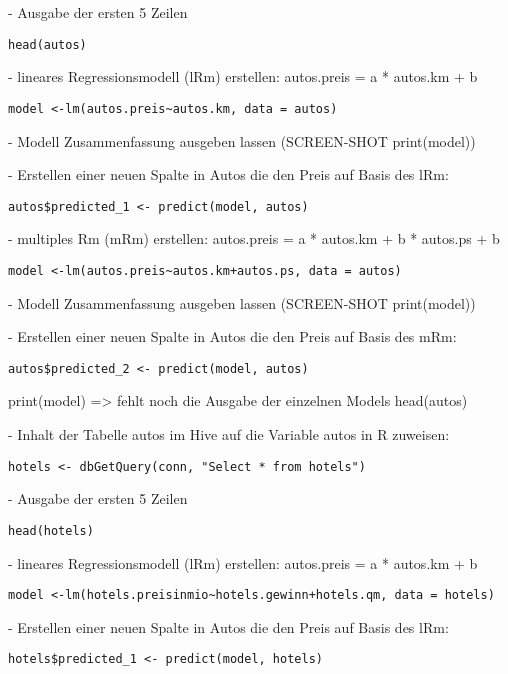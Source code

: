 - Ausgabe der ersten 5 Zeilen
\begin{lstlisting}
head(autos)
\end{lstlisting}

- lineares Regressionsmodell (lRm) erstellen: autos.preis = a * autos.km + b
\begin{lstlisting}
model <-lm(autos.preis~autos.km, data = autos)
\end{lstlisting}

- Modell Zusammenfassung ausgeben lassen (SCREEN-SHOT print(model))


- Erstellen einer neuen Spalte in Autos die den Preis auf Basis des lRm:
\begin{lstlisting}
autos$predicted_1 <- predict(model, autos)
\end{lstlisting}

- multiples Rm (mRm) erstellen: autos.preis = a * autos.km + b * autos.ps + b
\begin{lstlisting}
model <-lm(autos.preis~autos.km+autos.ps, data = autos)
\end{lstlisting}

- Modell Zusammenfassung ausgeben lassen (SCREEN-SHOT print(model))

- Erstellen einer neuen Spalte in Autos die den Preis auf Basis des mRm:
\begin{lstlisting}
autos$predicted_2 <- predict(model, autos)
\end{lstlisting}

print(model) => fehlt noch die Ausgabe der einzelnen Models
head(autos)

- Inhalt der Tabelle autos im Hive auf die Variable autos in R zuweisen:
\begin{lstlisting}
hotels <- dbGetQuery(conn, "Select * from hotels")
\end{lstlisting}

- Ausgabe der ersten 5 Zeilen
\begin{lstlisting}
head(hotels)
\end{lstlisting}

- lineares Regressionsmodell (lRm) erstellen: autos.preis = a * autos.km + b
\begin{lstlisting}
model <-lm(hotels.preisinmio~hotels.gewinn+hotels.qm, data = hotels)
\end{lstlisting}

- Erstellen einer neuen Spalte in Autos die den Preis auf Basis des lRm:
\begin{lstlisting}
hotels$predicted_1 <- predict(model, hotels)
\end{lstlisting}

